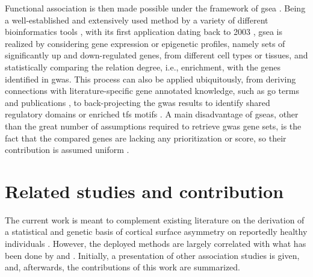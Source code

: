 Functional association is then made possible under the framework of \ac{gsea} \cite{Subramanian2005}. Being a well-established and extensively used method by a variety of different bioinformatics tools \cite{Chen2013,Watanabe2017,Liao2019}, with its first application dating back to 2003 \cite{Mootha2003}, \ac{gsea} is realized by considering gene expression or epigenetic profiles, namely sets of significantly up and down-regulated genes, from different cell types or tissues, and statistically comparing the relation degree, i.e., enrichment, with the genes identified in \ac{gwas}. This process can also be applied ubiquitously, from deriving connections with literature-specific gene annotated knowledge, such as \ac{go} terms \cite{Ashburner2000} and publications \cite{Szklarczyk2021}, to back-projecting the \ac{gwas} results to identify shared regulatory domains \cite{Janky2014} or enriched \acp{tf} motifs \cite{Heinz2010}. A main disadvantage of \acp{gsea}, other than the great number of assumptions required to retrieve \ac{gwas} gene sets, is the fact that the compared genes are lacking any prioritization or score, so their contribution is assumed uniform \cite{Wang2011}.


\section{Related studies and contribution}
The current work is meant to complement existing literature on the derivation of a statistical and genetic basis of cortical surface asymmetry on reportedly healthy individuals \cite{Sha2021,Kong2018,Kong2021,Zhao2022}. However, the deployed methods are largely correlated with what has been done by \citet{Naqvi2021} and \citet{Claes2018}. Initially, a presentation of other association studies is given, and, afterwards, the contributions of this work are summarized.

